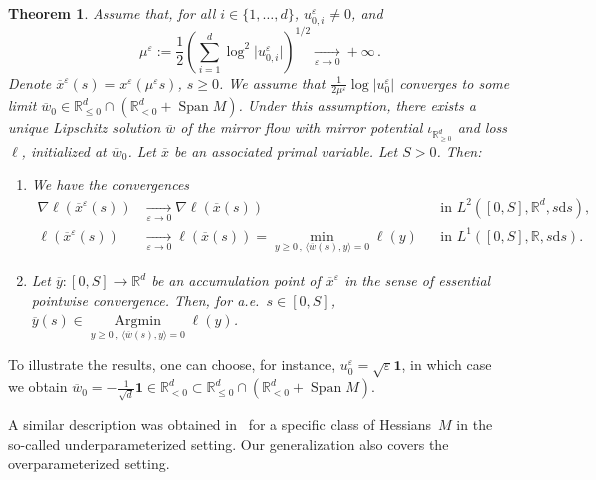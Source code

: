 \documentclass[11pt,english,reqno]{article}
\DeclareMathOperator{\Span}{Span}
\DeclareMathOperator{\Argmin}{Argmin}
\newcommand{\diff}{\mathrm{d}}
\newcommand{\R}{\mathbb{R}}
\renewcommand{\leq}{\leqslant}
\renewcommand{\geq}{\geqslant}
\theoremstyle{plain}
\newtheorem{thm}[proposition]{Theorem}
\theoremstyle{definition}
\theoremstyle{remark}
\numberwithin{equation}{section}
\begin{document}
\begin{thm}
	Assume that, for all $i \in \{1, \dots, d\}$, $u^\varepsilon_{0,i} \neq 0$, and 
	\begin{equation*}
		\mu^\varepsilon := \frac{1}{2} \left(\sum_{i=1}^{d} \log^2 \vert u^\varepsilon_{0,i} \vert\right)^{1/2} \xrightarrow[\varepsilon\to 0]{} +\infty \, .
	\end{equation*}
	Denote $\overline{x}^\varepsilon(s) = x^\varepsilon(\mu^\varepsilon s)$, $s \geq 0$. We assume that $\frac{1}{2\mu^\varepsilon} \log \vert u^\varepsilon_{0} \vert$ converges to some limit $\overline{w}_0 \in \R_{\leq 0}^d \cap \left(\R^d_{<0} + \Span M\right)$. Under this assumption, there exists a unique Lipschitz solution $\overline{w}$ of the mirror flow with mirror potential $\iota_{\R_{\geq 0}^d}$ and loss $\ell$, initialized at $\overline{w}_0$. Let $\overline{x}$ be an associated primal variable. Let $S > 0$. Then:
	\begin{enumerate}[label=(\alph*)]
		\item\label{it:dln-1} We have the convergences
		\begin{align*}
			\nabla \ell(\overline{x}^\varepsilon(s))
			&\xrightarrow[\varepsilon\to 0]{}
			\nabla \ell(\overline{x}(s))
			&&\text{in } L^2([0,S],\R^d, s\diff s),\\
			\ell(\overline{x}^\varepsilon(s))
			&\xrightarrow[\varepsilon\to 0]{}
			\ell(\overline{x}(s))
			= \min_{y \geq 0\,,\, \langle \overline{w}(s), y \rangle = 0} \ell(y)
			&&\text{in } L^1([0,S],\R, s\diff s).
		\end{align*}
		\item\label{it:dln-2} Let $\overline{y}:[0,S]\to\R^d$ be an accumulation point of $\overline{x}^\varepsilon$ in the sense of essential pointwise convergence. Then, for a.e.~$s \in [0,S]$, $\overline{y}(s) \in \underset{y \geq 0\,,\,  \langle \overline{w}(s), y \rangle = 0}{\Argmin} \ell(y)$.
	\end{enumerate}
\end{thm}

To illustrate the results, one can choose, for instance, $u^\varepsilon_0 = \sqrt{\varepsilon} \mathbf{1}$, in which case we obtain $\overline{w}_0 = - \frac{1}{\sqrt{d}} \mathbf{1} \in \R^d_{<0} \subset \R_{\leq 0}^d \cap \left(\R^d_{<0} + \Span M\right)$. 

A similar description was obtained in~\cite{berthier2023incremental} for a specific class of Hessians~$M$ in the so-called underparameterized setting. Our generalization also covers the overparameterized setting.
\end{document}
